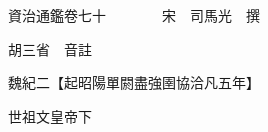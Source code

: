 










 


 
 


 

  
  
  
  
  





  
  
  
  
  
 
  

  

  
  
  



  

 
 

  
   




  

  
  


  　　資治通鑑卷七十　　　　宋　司馬光　撰

　　胡三省　音註

　　魏紀二【起昭陽單閼盡強圉協洽凡五年】

　　世祖文皇帝下

